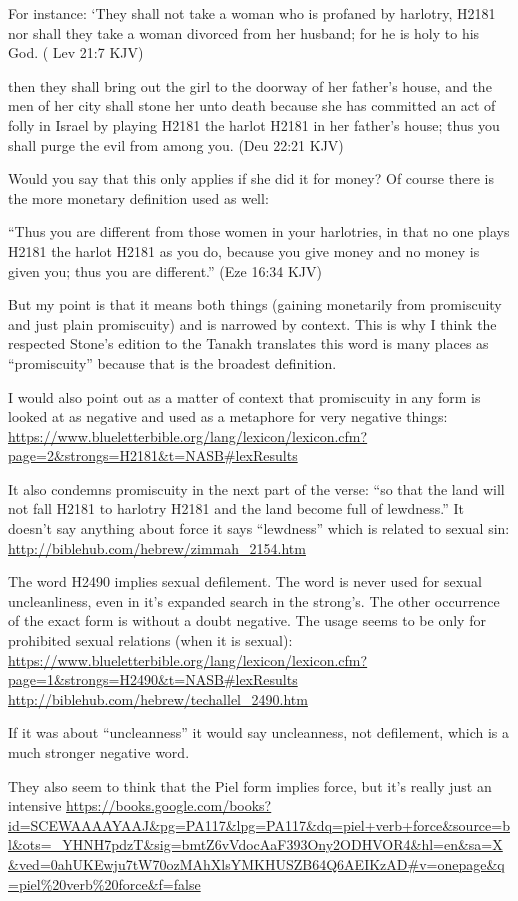 \documentclass[11pt]{article}
\begin{document}
{For instance: ‘They shall not take a woman who is profaned by harlotry, H2181 nor shall they take a woman divorced from her husband; for he is holy to his God. ( Lev 21:7 KJV)

then they shall bring out the girl to the doorway of her father’s house, and the men of her city shall stone her unto death because she has committed an act of folly in Israel by playing H2181 the harlot H2181 in her father’s house; thus you shall purge the evil from among you. (Deu 22:21 KJV)

Would you say that this only applies if she did it for money? Of course there is the more monetary definition used as well:

“Thus you are different from those women in your harlotries, in that no one plays H2181 the harlot H2181 as you do, because you give money and no money is given you; thus you are different.” (Eze 16:34 KJV)

But my point is that it means both things (gaining monetarily from promiscuity and just plain promiscuity) and is narrowed by context. This is why I think the respected Stone’s edition to the Tanakh translates this word is many places as “promiscuity” because that is the broadest definition.

I would also point out as a matter of context that promiscuity in any form is looked at as negative and used as a metaphore for very negative things: \url{https://www.blueletterbible.org/lang/lexicon/lexicon.cfm?page=2&strongs=H2181&t=NASB#lexResults}

It also condemns promiscuity in the next part of the verse: 
“so that the land will not fall H2181 to harlotry H2181 and the land become full of lewdness.” It doesn’t say anything about force it says “lewdness” which is related to sexual sin: \url{http://biblehub.com/hebrew/zimmah_2154.htm}

The word H2490 implies sexual defilement. The word is never used for sexual uncleanliness, even in it’s expanded search in the strong’s. The other occurrence of the exact form is without a doubt negative. The usage seems to be only for prohibited sexual relations (when it is sexual):
\url{https://www.blueletterbible.org/lang/lexicon/lexicon.cfm?page=1&strongs=H2490&t=NASB#lexResults}
\url{http://biblehub.com/hebrew/techallel_2490.htm}

If it was about “uncleanness” it would say uncleanness, not defilement, which is a much stronger negative word.

They also seem to think that the Piel form implies force, but it’s really just an intensive
\url{https://books.google.com/books?id=SCEWAAAAYAAJ&pg=PA117&lpg=PA117&dq=piel+verb+force&source=bl&ots=_YHNH7pdzT&sig=bmtZ6vVdocAaF393Ony2ODHVOR4&hl=en&sa=X&ved=0ahUKEwju7tW70ozMAhXlsYMKHUSZB64Q6AEIKzAD#v=onepage&q=piel%20verb%20force&f=false}

}
\end{document}
